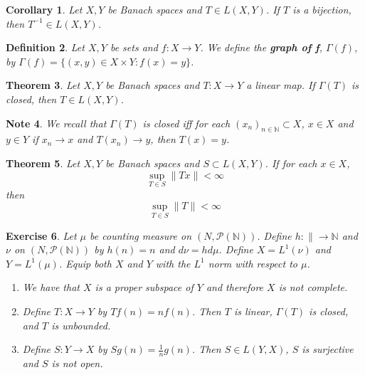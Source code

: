 \documentclass[12pt]{amsart}
\newtheorem{thm}{Theorem}[subsection]
\newtheorem{cor}[thm]{Corollary}
\newtheorem{defn}[thm]{Definition}
\newtheorem{note}[thm]{Note}
\newtheorem{ex}[thm]{Exercise}
\newcommand{\Gam}{\Gamma}
\newcommand{\N}{\mathbb{N}}
\newcommand{\MP}{\mathcal{P}}
\newcommand{\conv}[1]{\xrightarrow{#1}}
\begin{document}
	\begin{cor}
		Let $X, Y$ be Banach spaces and $T \in L(X,Y)$. If $T$ is a bijection, then $T^{-1} \in L(X,Y)$.
	\end{cor}
	
	\begin{defn}
		Let $X,Y$ be sets and $f:X \rightarrow Y$. We define the \textbf{graph of f}, $\Gam(f)$, by $\Gam(f) = \{(x,y) \in X \times Y: f(x) = y\}$.
	\end{defn}
	
	\begin{thm}
		Let $X, Y$ be Banach spaces and $T:X \rightarrow Y$ a linear map. If $\Gam(T)$ is closed, then $T \in L(X,Y)$.  
	\end{thm}
	
	\begin{note}
		We recall that $\Gam(T)$ is closed iff for each $(x_n)_{n \in \N} \subset X$, $x \in X$ and $y \in Y$ if $x_n \conv{} x$ and $T(x_n) \conv{} y$, then $T(x) = y$. 
	\end{note}
	
	\begin{thm}
		
		Let $X, Y$ be Banach spaces and $S \subset L(X,Y)$. If for each $x \in X$, $$\sup_{T \in S} \|Tx \|< \infty$$ then $$\sup_{T \in S} \|T \|< \infty$$
	\end{thm}
	
	\begin{ex}
		Let $\mu$ be counting measure on $(N, \MP(\N))$. Define $h: \|\rightarrow \N$ and $ \nu$ on $(N, \MP(\N))$ by $h(n) = n$ and $d \nu = h d \mu$. Define $X=L^1(\nu)$ and $Y = L^1(\mu)$. Equip both $X$ and $Y$ with the $L^1$ norm with respect to $\mu$. 
		\begin{enumerate}
			\item We have that $X$ is a proper subspace of $Y$ and therefore $X$ is not complete.
			\item Define $T: X \rightarrow Y$ by $Tf(n) = nf(n)$. Then $T$ is linear, $\Gam(T)$ is closed, and $T$ is unbounded.
			\item Define $S:Y \rightarrow X$ by $Sg(n) = \frac{1}{n}g(n)$. Then $S \in L(Y,X)$, $S$ is surjective and $S$ is not open. 
		\end{enumerate}
	\end{ex}
	
\end{document}
